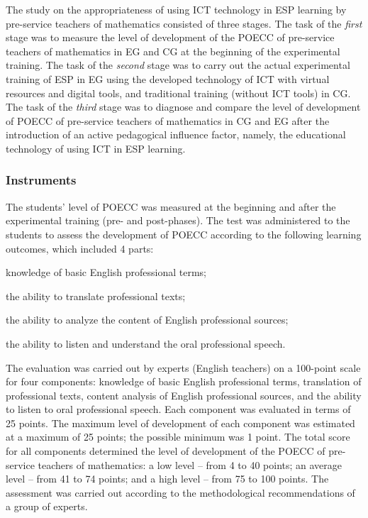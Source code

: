 The study on the appropriateness of using ICT technology in ESP learning
by pre-service teachers of mathematics consisted of three stages. The
task of the \emph{first} stage was to measure the level of development
of the POECC of pre-service teachers of mathematics in EG and CG at the
beginning of the experimental training. The task of the \emph{second}
stage was to carry out the actual experimental training of ESP in EG
using the developed technology of ICT with virtual resources and digital
tools, and traditional training (without ICT tools) in CG. The task of
the \emph{third} stage was to diagnose and compare the level of
development of POECC of pre-service teachers of mathematics in CG and EG
after the introduction of an active pedagogical influence factor,
namely, the educational technology of using ICT in ESP learning.

\subsubsection{Instruments}\label{subsubsec-instruments}

The students' level of POECC was measured at the beginning and after the
experimental training (pre- and post-phases). The test was administered
to the students to assess the development of POECC according to the
following learning outcomes, which included 4 parts: \begin{enumerate*}[label=\arabic*)]
\item  knowledge of
basic English professional terms; 
\item the ability to translate
professional texts; 
\item the ability to analyze the content of English
professional sources; 
\item the ability to listen and understand the oral
professional speech.
\end{enumerate*}

The evaluation was carried out by experts (English teachers) on a
100-point scale for four components: knowledge of basic English
professional terms, translation of professional texts, content analysis
of English professional sources, and the ability to listen to oral
professional speech. Each component was evaluated in terms of 25 points.
The maximum level of development of each component was estimated at a
maximum of 25 points; the possible minimum was 1 point. The total score
for all components determined the level of development of the POECC of
pre-service teachers of mathematics: a low level – from 4 to 40 points;
an average level – from 41 to 74 points; and a high level – from 75 to
100 points. The assessment was carried out according to the
methodological recommendations of a group of experts.

